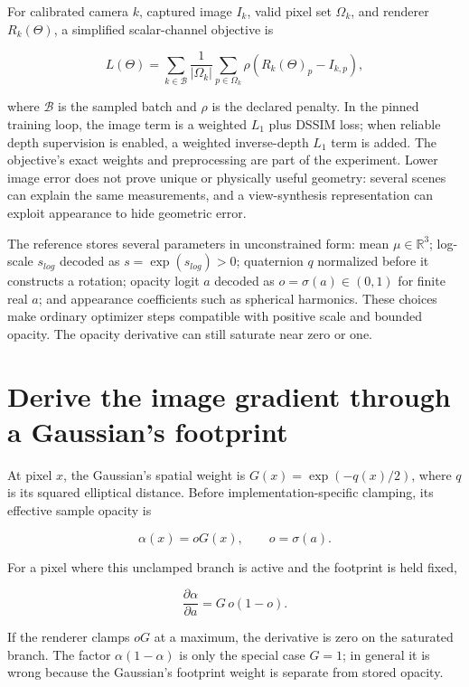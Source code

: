 For calibrated camera \(k\), captured image \(I_k\), valid pixel set \(\Omega_k\), and renderer \(R_k(\Theta)\), a simplified scalar-channel objective is

\[
L(\Theta)=\sum_{k\in\mathcal B}\frac{1}{|\Omega_k|}\sum_{p\in\Omega_k}\rho\left(R_k(\Theta)_p-I_{k,p}\right),
\]

where \(\mathcal B\) is the sampled batch and \(\rho\) is the declared penalty. In the pinned training loop, the image term is a weighted \(L_1\) plus DSSIM loss; when reliable depth supervision is enabled, a weighted inverse-depth \(L_1\) term is added. The objective's exact weights and preprocessing are part of the experiment. Lower image error does not prove unique or physically useful geometry: several scenes can explain the same measurements, and a view-synthesis representation can exploit appearance to hide geometric error.

The reference stores several parameters in unconstrained form: mean \(\mu\in\mathbb R^3\); log-scale \(s_{log}\) decoded as \(s=\exp(s_{log})>0\); quaternion \(q\) normalized before it constructs a rotation; opacity logit \(a\) decoded as \(o=\sigma(a)\in(0,1)\) for finite real \(a\); and appearance coefficients such as spherical harmonics. These choices make ordinary optimizer steps compatible with positive scale and bounded opacity. The opacity derivative can still saturate near zero or one.

\section{Derive the image gradient through a Gaussian's footprint}\label{04-visual-computing-ii-ch039-derive-the-image-gradient-through-a-gaussians-footprint}

At pixel \(x\), the Gaussian's spatial weight is \(G(x)=\exp(-q(x)/2)\), where \(q\) is its squared elliptical distance. Before implementation-specific clamping, its effective sample opacity is

\[
\alpha(x)=oG(x),\qquad o=\sigma(a).
\]

For a pixel where this unclamped branch is active and the footprint is held fixed,

\[
\frac{\partial\alpha}{\partial a}=G\,o(1-o).
\]

If the renderer clamps \(oG\) at a maximum, the derivative is zero on the saturated branch. The factor \(\alpha(1-\alpha)\) is only the special case \(G=1\); in general it is wrong because the Gaussian's footprint weight is separate from stored opacity.


